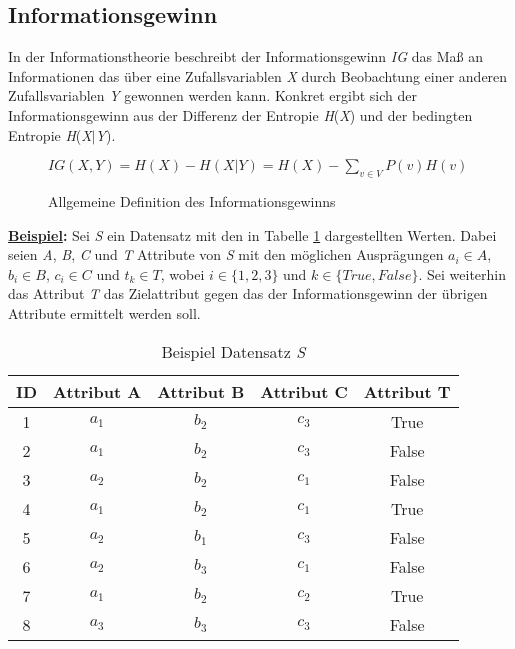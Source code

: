 \subsection{Informationsgewinn}
\label{id3:gain}
In der Informationstheorie beschreibt der Informationsgewinn \textit{IG} das Maß an Informationen das über eine Zufallsvariablen \textit{X} durch Beobachtung einer anderen Zufallsvariablen \textit{Y} gewonnen werden kann. \autocite{DataMining} Konkret ergibt sich der Informationsgewinn aus der Differenz der Entropie \textit{H}(\textit{X}) und der bedingten Entropie \textit{H}(\textit{X}$\vert$\textit{Y}). \autocite{Informat29:online}\\

\begin{figure}[H]
    \label{fig:gain}
    \vspace{0.5cm}
    \centering
        $ IG(X,Y) = H(X) - H(X\vert Y) = H(X) - \sum\limits_{v\in V} P(v)H(v)$
    \caption{Allgemeine Definition des Informationsgewinns \autocite{DataMining}\autocite{BedingteEntropie:online}}
\end{figure}

\textbf{\underline{Beispiel}:} Sei \textit{S} ein Datensatz mit den in Tabelle \ref{table:gain} dargestellten Werten. Dabei seien \textit{A}, \textit{B}, \textit{C} und \textit{T} Attribute von \textit{S} mit den möglichen Ausprägungen $a_{i}\in A$, $b_{i}\in B$, $c_{i}\in C$ und $t_{k}\in T$, wobei $i\in\{1,2,3\}$ und $k\in\{True,False\}$. Sei weiterhin das Attribut \textit{T} das Zielattribut gegen das der Informationsgewinn der übrigen Attribute ermittelt werden soll.

\begin{center}
    \begin{table}[H]
        \centering
        \begin{tabularx}{0.8\linewidth}{ccccc}
            \toprule
            \textbf{ID} & \textbf{Attribut A} & \textbf{Attribut B} & \textbf{Attribut C} & \textbf{Attribut T}\\
            \toprule
            1 & $a_{1}$ & $b_{2}$ & $c_{3}$ & True  \\
            2 & $a_{1}$ & $b_{2}$ & $c_{3}$ & False \\
            3 & $a_{2}$ & $b_{2}$ & $c_{1}$ & False \\
            4 & $a_{1}$ & $b_{2}$ & $c_{1}$ & True  \\
            5 & $a_{2}$ & $b_{1}$ & $c_{3}$ & False \\ 
            6 & $a_{2}$ & $b_{3}$ & $c_{1}$ & False \\
            7 & $a_{1}$ & $b_{2}$ & $c_{2}$ & True  \\  
            8 & $a_{3}$ & $b_{3}$ & $c_{3}$ & False  \\
            \bottomrule
        \end{tabularx}
        \caption{Beispiel Datensatz \textit{S}}
        \label{table:gain}
    \end{table}
\end{center}

